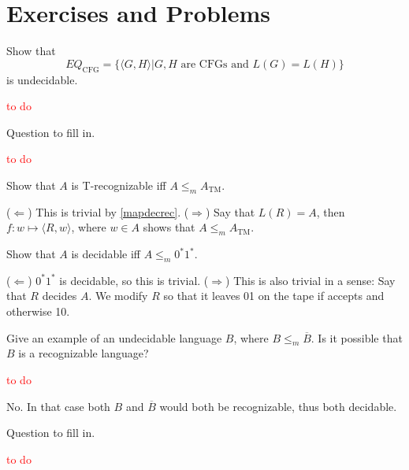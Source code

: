 \section*{Exercises and Problems}

\begin{exercise}{5.1}
  Show that
  \[
    EQ_{\mathrm{CFG}}=\{\langle G,H\rangle|G,H\text{ are CFGs and }L(G)=L(H)\}
  \]
  is undecidable.
\end{exercise}

\textcolor{red}{to do}

\setcounter{exercise}{20}

\begin{exercise}{5.21}
  Question to fill in.
\end{exercise}

\textcolor{red}{to do}

\begin{exercise}{5.22}
  Show that $A$ is T-recognizable iff $A\leq_mA_{\mathrm{TM}}$.
\end{exercise}

($\Leftarrow$) This is trivial by \ref{mapdecrec}.\newline
($\Rightarrow$) Say that $L(R)=A$, then $f:w\mapsto\langle R,w\rangle$, where $w\in A$ shows that $A\leq_m A_{\mathrm{TM}}$.

\begin{exercise}{5.23}
  Show that $A$ is decidable iff $A\leq_m0^*1^*$.
\end{exercise}

($\Leftarrow$) $0^*1^*$ is decidable, so this is trivial.\newline
($\Rightarrow$) This is also trivial in a sense: Say that $R$ decides $A$. We modify $R$ so that it leaves 01 on the tape if accepts and otherwise 10.

\setcounter{exercise}{24}

\begin{exercise}{5.25}
  Give an example of an undecidable language $B$, where $B\leq_m \overline{B}$. Is it possible that $B$ is a recognizable language?
\end{exercise}

\textcolor{red}{to do}

No. In that case both $B$ and $\overline{B}$ would both be recognizable, thus both decidable.

\begin{exercise}{5.26}
  Question to fill in.
\end{exercise}

\textcolor{red}{to do}
